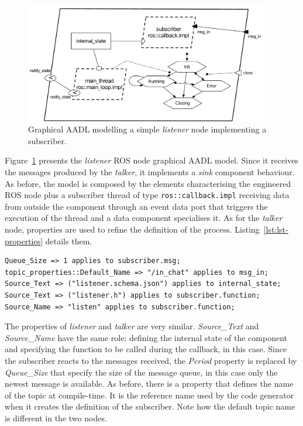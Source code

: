 \begin{figure}[t]
\centering
\includegraphics[width=0.95\textwidth]{gfx/usecase-subscriber}
\caption{Graphical AADL modelling a simple \textit{listener} node implementing a subscriber.}\label{fig:usecase-subscriber}
\end{figure}

Figure~\ref{fig:usecase-subscriber} presents the \textit{listener} ROS node graphical AADL model. Since it receives the messages produced by the \textit{talker}, it implements a \textit{sink} component behaviour. As before, the model is composed by the elements characterising the engineered ROS node plus a subscriber thread of type \texttt{ros::callback.impl} receiving data from outside the component through an event data port that triggers the execution of the thread and a data component specialises it. As for the \textit{talker} node, properties are used to refine the definition of the process. Listing~\ref{lst:lst-properties} details them.

\begin{lstlisting}[language=AADL,caption={Properties of the listener node.},label=lst:lst-properties]
Queue_Size => 1 applies to subscriber.msg;
topic_properties::Default_Name => "/in_chat" applies to msg_in;
Source_Text => ("listener.schema.json") applies to internal_state;
Source_Text => ("listener.h") applies to subscriber.function;
Source_Name => "listen" applies to subscriber.function;
\end{lstlisting}

The properties of \textit{listener} and \textit{talker} are very similar. \textit{Source\_Text} and \textit{Source\_Name} have the same role: defining the internal state of the component and specifying the function to be called during the callback, in this case. Since the subscriber reacts to the messages received, the \textit{Period} property is replaced by \textit{Queue\_Size} that specify the size of the message queue, in this case only the newest message is available. As before, there is a property that defines the name of the topic at compile-time. It is the reference name used by the code generator when it creates the definition of the subscriber. Note how the default topic name is different in the two nodes.

